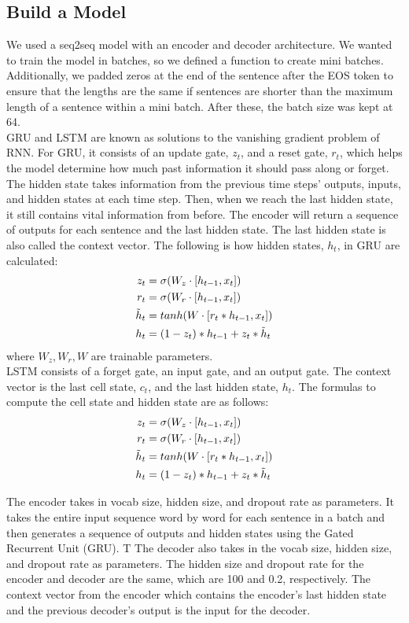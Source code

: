 \documentclass[conference]{IEEEtran}
\begin{document}
\subsection{Build a Model}
\indent We used a seq2seq model with an encoder and decoder architecture. We wanted to train the model in batches, so we defined a function to create mini batches. Additionally, we padded zeros at the end of the sentence after the EOS token to ensure that the lengths are the same if sentences are shorter than the maximum length of a sentence within a mini batch. After these, the batch size was kept at 64. \\
\indent GRU and LSTM are known as solutions to the vanishing gradient problem of RNN. For GRU, it consists of an update gate, $z_t$, and a reset gate, $r_t$, which helps the model determine how much past information it should pass along or forget. The hidden state takes information from the previous time steps’ outputs, inputs, and hidden states at each time step. Then, when we reach the last hidden state, it still contains vital information from before. The encoder will return a sequence of outputs for each sentence and the last hidden state. The last hidden state is also called the context vector. The following is how hidden states, $h_t$, in GRU are calculated: 
\begin{align}
z_t &= \sigma(W_z \cdot [h_{t-1},x_t]) \\
r_t &= \sigma(W_r \cdot [h_{t-1},x_t]) \\
\Tilde{h}_t &= tanh(W\cdot [r_t*h_{t-1},x_t]) \\
h_t &=(1-z_t)*h_{t-1}+z_t*\Tilde{h}_t 
\end{align}
where $W_z, W_r, W$ are trainable parameters. \\
LSTM consists of a forget gate, an input gate, and an output gate. The context vector is the last cell state, $c_t$, and the last hidden state, $h_t$. The formulas to compute the cell state and hidden state are as follows:
\begin{align}
z_t &= \sigma(W_z \cdot [h_{t-1},x_t]) \\
r_t &= \sigma(W_r \cdot [h_{t-1},x_t]) \\
\Tilde{h}_t &= tanh(W\cdot [r_t*h_{t-1},x_t]) \\
h_t &=(1-z_t)*h_{t-1}+z_t*\Tilde{h}_t 
\end{align}

The encoder takes in vocab size, hidden size, and dropout rate as parameters. It takes the entire input sequence word by word for each sentence in a batch and then generates a sequence of outputs and hidden states using the Gated Recurrent Unit (GRU). T
\indent The decoder also takes in the vocab size, hidden size, and dropout rate as parameters. The hidden size and dropout rate for the encoder and decoder are the same, which are 100 and 0.2, respectively. The context vector from the encoder which contains the encoder’s last hidden state and the previous decoder’s output is the input for the decoder. 
\end{document}
